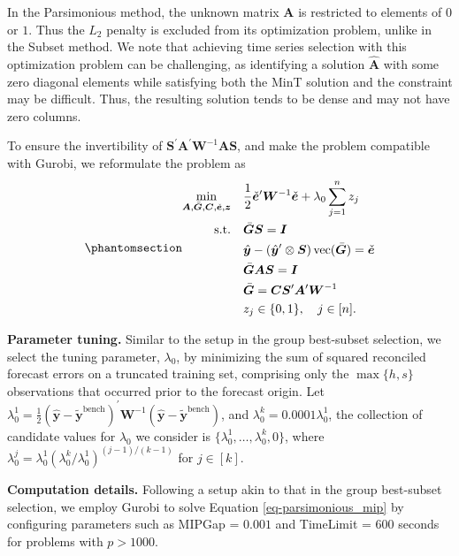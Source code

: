 \documentclass[
  11pt]{article}
\theoremstyle{plain}
\theoremstyle{remark}
\begin{document}
In the Parsimonious method, the unknown matrix \(\bm{A}\) is restricted
to elements of \(0\) or \(1\). Thus the \(L_2\) penalty is excluded from
its optimization problem, unlike in the Subset method. We note that
achieving time series selection with this optimization problem can be
challenging, as identifying a solution \(\hat{\bm{A}}\) with some zero
diagonal elements while satisfying both the MinT solution and the
constraint may be difficult. Thus, the resulting solution tends to be
dense and may not have zero columns.

To ensure the invertibility of
\(\bm{S}^{\prime}\bm{A}^{\prime}\bm{W}^{-1}\bm{A}\bm{S}\), and make the
problem compatible with Gurobi, we reformulate the problem as
\begin{equation}\phantomsection\label{eq-parsimonious_mip}{
\begin{aligned}
\min_{\bm{A},\bar{\bm{G}},\bm{C},\check{\bm{e}},\bm{z}} \quad & \frac{1}{2}\check{\bm{e}}^{\prime} \bm{W}^{-1}\check{\bm{e}} + \lambda_0 \sum_{j=1}^n z_j \\
\text{s.t.} \quad & \bar{\bm{G}}\bm{S} = \bm{I} \\
& \hat{\bm{y}}-\left(\hat{\bm{y}}^{\prime} \otimes \bm{S}\right)\operatorname{vec}(\bar{\bm{G}}) = \check{\bm{e}} \\
& \bar{\bm{G}}\bm{A}\bm{S} = \bm{I} \\
& \bar{\bm{G}} = \bm{C}\bm{S}^{\prime}\bm{A}^{\prime}\bm{W}^{-1} \\
& z_j \in\{0,1\}, \quad j \in[n].
\end{aligned}
}\end{equation}

\textbf{Parameter tuning.} Similar to the setup in the group best-subset
selection, we select the tuning parameter, \(\lambda_0\), by minimizing
the sum of squared reconciled forecast errors on a truncated training
set, comprising only the \(\max\{h, s\}\) observations that occurred
prior to the forecast origin. Let
\(\lambda_{0}^{1} = \frac{1}{2}\left(\hat{\bm{y}}-\tilde{\bm{y}}^{\text{bench}}\right)^{\prime} \bm{W}^{-1}\left(\hat{\bm{y}}-\tilde{\bm{y}}^{\text{bench}}\right)\),
and \(\lambda_{0}^{k} = 0.0001\lambda_{0}^{1}\), the collection of
candidate values for \(\lambda_0\) we consider is
\(\{\lambda_{0}^{1},\dots,\lambda_{0}^{k}, 0\}\), where
\(\lambda_{0}^{j} = \lambda_{0}^{1}\left(\lambda_{0}^{k} / \lambda_{0}^{1}\right)^{(j-1) / (k-1)}\)
for \(j \in [k]\).

\textbf{Computation details.} Following a setup akin to that in the
group best-subset selection, we employ Gurobi to solve Equation
\eqref{eq-parsimonious_mip} by configuring parameters such as MIPGap =
\(0.001\) and TimeLimit = \(600\) seconds for problems with
\(p > 1000\).
\end{document}

